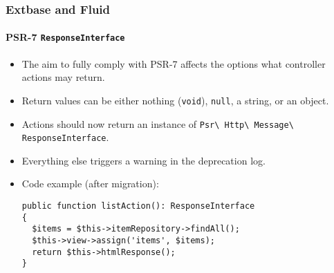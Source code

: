 %

\begin{frame}[fragile]
	\frametitle{Extbase and Fluid}
	\framesubtitle{PSR-7 \texttt{ResponseInterface}}


	\begin{itemize}
		\item The aim to fully comply with PSR-7 affects the options what
			controller actions may return.
		\item Return values can be either nothing (\texttt{void}), \texttt{null},
			a string, or an object.
		\item Actions should now return an instance of
			\small\texttt{Psr\textbackslash
				Http\textbackslash
				Message\textbackslash
				ResponseInterface}.\normalsize
		\item Everything else triggers a warning in the deprecation log.
		\item Code example (after migration):
\begin{lstlisting}
public function listAction(): ResponseInterface
{
  $items = $this->itemRepository->findAll();
  $this->view->assign('items', $items);
  return $this->htmlResponse();
}
\end{lstlisting}

	\end{itemize}

\end{frame}


